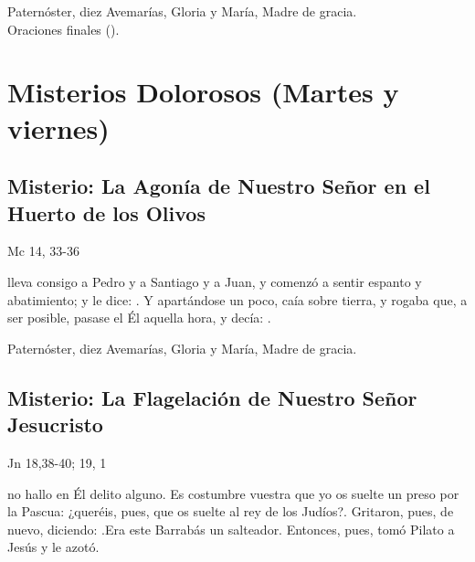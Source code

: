 \documentclass[10pt,a4paper,oneside]{book}
\newcounter{sorrowful-counter}
\begin{document}
\begin{center}
      Paternóster, diez Avemarías, Gloria y María, Madre de gracia.\\
      Oraciones finales ().
\end{center}


\section*{Misterios Dolorosos (Martes y viernes)}

\subsection*{ Misterio: La Agonía de Nuestro Señor en el Huerto de los Olivos}
\begin{flushright}
      {\color{red}Mc 14, 33-36}
\end{flushright}
 lleva consigo a Pedro y a Santiago y a Juan, y comenzó a sentir espanto y abatimiento; y le dice: . Y apartándose un poco, caía sobre tierra, y rogaba que, a ser posible, pasase el Él aquella hora, y decía: .

\begin{center}
      Paternóster, diez Avemarías, Gloria y María, Madre de gracia.
\end{center}

\subsection*{ Misterio: La Flagelación de Nuestro Señor Jesucristo}
\begin{flushright}
      {\color{red}Jn 18,38-40; 19, 1}
\end{flushright}
 no hallo en Él delito alguno. Es costumbre vuestra que yo os suelte un preso por la Pascua: ¿queréis, pues, que os suelte al rey de los Judíos?{\guillemotright}. 
Gritaron, pues, de nuevo, diciendo: .Era este Barrabás un salteador. Entonces, pues, tomó Pilato a Jesús y le azotó.
\end{document}
